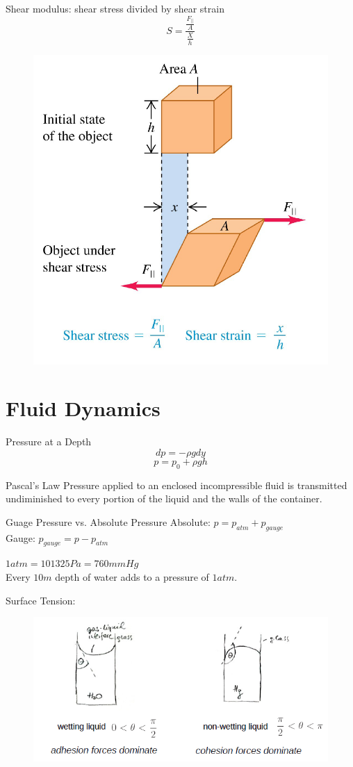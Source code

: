\documentclass{beamer}
\begin{document}
\begin{frame}
  \begin{block}{Shear modulus: shear stress divided by shear strain}
    $$S=\frac{\frac{F_{\|}}{A}}{\frac{X}{h}}$$
  \end{block}
  \begin{figure}[htbp]
  \centering
  \includegraphics[width=0.4 \linewidth, angle =0]{s's.png}
  \label{fig:s's}
  \end{figure} 
\end{frame}

\section{Fluid Dynamics}
\begin{frame}
  \begin{block}{Pressure at a Depth}
    $$dp = -\rho g dy$$
    $$p = p_0 + \rho gh$$
  \end{block}
  \begin{block}{Pascal's Law}
    Pressure applied to an enclosed incompressible fluid is transmitted
undiminished to every portion of the liquid and the walls of the container.
  \end{block}
  \begin{block}{Guage Pressure vs. Absolute Pressure}
    Absolute: $p = p_{atm}+p_{gauge}$\\
    Gauge: $p_{gauge} = p - p_{atm}$ 
  \end{block}
  $1atm = 101325Pa = 760mmHg$\\  
  Every $10m$ depth of water adds to a pressure of $1atm$.
\end{frame}
\begin{frame}
  Surface Tension:
  \begin{figure}[htbp]
  \centering
  \includegraphics[width=0.9 \linewidth, angle =0]{surface.png}
  \label{fig:surface}
  \end{figure}
\end{frame}
\end{document}

